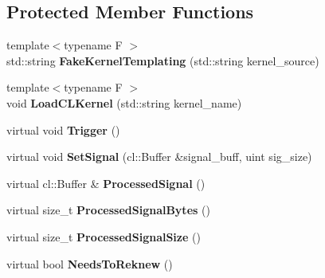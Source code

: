 \subsection*{Protected Member Functions}
\begin{DoxyCompactItemize}
\item 
{\footnotesize template$<$typename F $>$ }\\std\+::string {\bfseries Fake\+Kernel\+Templating} (std\+::string kernel\+\_\+source)\hypertarget{classjaspl_1_1ocl_1_1_task_item_aebceb791e8b1dbe70af39047d8fdae21}{}\label{classjaspl_1_1ocl_1_1_task_item_aebceb791e8b1dbe70af39047d8fdae21}

\item 
{\footnotesize template$<$typename F $>$ }\\void {\bfseries Load\+C\+L\+Kernel} (std\+::string kernel\+\_\+name)\hypertarget{classjaspl_1_1ocl_1_1_task_item_a800ffc9212ce8c25771e21b22ae867ce}{}\label{classjaspl_1_1ocl_1_1_task_item_a800ffc9212ce8c25771e21b22ae867ce}

\item 
virtual void {\bfseries Trigger} ()\hypertarget{classjaspl_1_1ocl_1_1_task_item_a186aa96ac98ce8bb8c63818e8b33e3fa}{}\label{classjaspl_1_1ocl_1_1_task_item_a186aa96ac98ce8bb8c63818e8b33e3fa}

\item 
virtual void {\bfseries Set\+Signal} (cl\+::\+Buffer \&signal\+\_\+buff, uint sig\+\_\+size)\hypertarget{classjaspl_1_1ocl_1_1_task_item_a906407a36a6dfb930b37eabaa612cea3}{}\label{classjaspl_1_1ocl_1_1_task_item_a906407a36a6dfb930b37eabaa612cea3}

\item 
virtual cl\+::\+Buffer \& {\bfseries Processed\+Signal} ()\hypertarget{classjaspl_1_1ocl_1_1_task_item_af607becf93865c5d3d8f3df6ef87f867}{}\label{classjaspl_1_1ocl_1_1_task_item_af607becf93865c5d3d8f3df6ef87f867}

\item 
virtual size\+\_\+t {\bfseries Processed\+Signal\+Bytes} ()\hypertarget{classjaspl_1_1ocl_1_1_task_item_ac82006308e53c6e42144d253bde9b535}{}\label{classjaspl_1_1ocl_1_1_task_item_ac82006308e53c6e42144d253bde9b535}

\item 
virtual size\+\_\+t {\bfseries Processed\+Signal\+Size} ()\hypertarget{classjaspl_1_1ocl_1_1_task_item_aface585662048bfa00cda3292e9d9273}{}\label{classjaspl_1_1ocl_1_1_task_item_aface585662048bfa00cda3292e9d9273}

\item 
virtual bool {\bfseries Needs\+To\+Reknew} ()\hypertarget{classjaspl_1_1ocl_1_1_task_item_a20e681f2c7b9930f99fc73ece96cb67c}{}\label{classjaspl_1_1ocl_1_1_task_item_a20e681f2c7b9930f99fc73ece96cb67c}


\end{DoxyCompactItemize}
